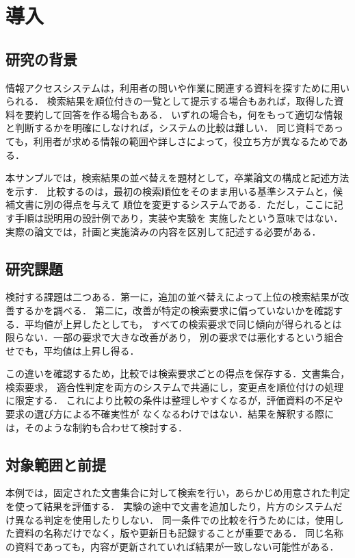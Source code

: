 \chapter{導入}
\label{sec:introduction}

\section{研究の背景}
情報アクセスシステムは，利用者の問いや作業に関連する資料を探すために用いられる．
検索結果を順位付きの一覧として提示する場合もあれば，取得した資料を要約して回答を作る場合もある．
いずれの場合も，何をもって適切な情報と判断するかを明確にしなければ，システムの比較は難しい．
同じ資料であっても，利用者が求める情報の範囲や詳しさによって，役立ち方が異なるためである．

本サンプルでは，検索結果の並べ替えを題材として，卒業論文の構成と記述方法を示す．
比較するのは，最初の検索順位をそのまま用いる基準システムと，候補文書に別の得点を与えて
順位を変更するシステムである．ただし，ここに記す手順は説明用の設計例であり，実装や実験を
実施したという意味ではない．実際の論文では，計画と実施済みの内容を区別して記述する必要がある．

\section{研究課題}
検討する課題は二つある．第一に，追加の並べ替えによって上位の検索結果が改善するかを調べる．
第二に，改善が特定の検索要求に偏っていないかを確認する．平均値が上昇したとしても，
すべての検索要求で同じ傾向が得られるとは限らない．一部の要求で大きな改善があり，
別の要求では悪化するという組合せでも，平均値は上昇し得る．

この違いを確認するため，比較では検索要求ごとの得点を保存する．文書集合，検索要求，
適合性判定を両方のシステムで共通にし，変更点を順位付けの処理に限定する．
これにより比較の条件は整理しやすくなるが，評価資料の不足や要求の選び方による不確実性が
なくなるわけではない．結果を解釈する際には，そのような制約も合わせて検討する．

\newpage
\section{対象範囲と前提}
\label{sec:scope}
本例では，固定された文書集合に対して検索を行い，あらかじめ用意された判定を使って結果を評価する．
実験の途中で文書を追加したり，片方のシステムだけ異なる判定を使用したりしない．
同一条件での比較を行うためには，使用した資料の名称だけでなく，版や更新日も記録することが重要である．
同じ名称の資料であっても，内容が更新されていれば結果が一致しない可能性がある．


